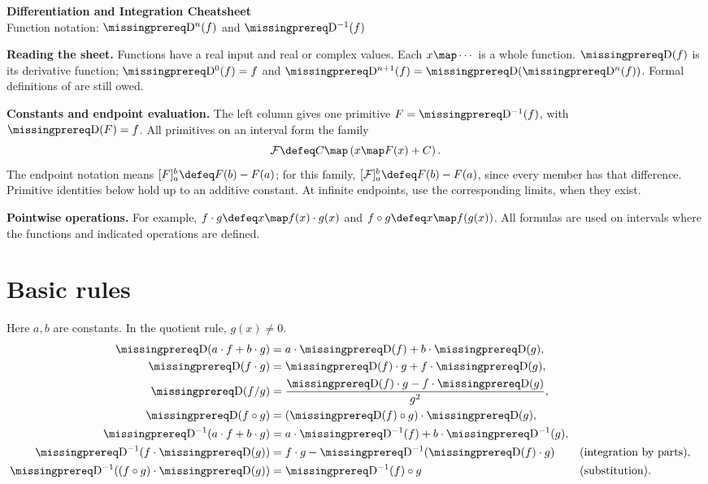 \documentclass[10pt]{article}
\begin{document}
\begin{center}
  {\Large\bfseries Differentiation and Integration Cheatsheet}\\[2pt]
  Function notation: $\DiffOp^n(f)$ and $\DiffOp^{-1}(f)$
\end{center}

\textbf{Reading the sheet.}
Functions have a real input and real or complex values. Each $x\map\cdots$ is
a whole function. $\DiffOp(f)$ is its derivative function;
$\DiffOp^0(f)=f$ and $\DiffOp^{n+1}(f)=\DiffOp(\DiffOp^n(f))$.
Formal definitions of  are still owed.

\textbf{Constants and endpoint evaluation.}
The left column gives one primitive $F=\DiffOp^{-1}(f)$, with $\DiffOp(F)=f$.
All primitives on an interval form the family
\[
  \mathcal F\defeq C\map\left(x\map F(x)+C\right).
\]
The endpoint notation means $[F]_a^b\defeq F(b)-F(a)$; for this family,
$[\mathcal F]_a^b\defeq F(b)-F(a)$, since every member has that difference.
Primitive identities below hold up to an additive constant. At infinite endpoints,
use the corresponding limits, when they exist.

\textbf{Pointwise operations.}
For example, $f\cdot g\defeq x\map f(x)\cdot g(x)$ and
$f\circ g\defeq x\map f(g(x))$. All formulas are used on intervals where the
functions and indicated operations are defined.

\section*{Basic rules}
Here $a,b$ are constants. In the quotient rule, $g(x)\ne0$.
\begin{align*}
  \DiffOp(a\cdot f+b\cdot g)
    &=a\cdot\DiffOp(f)+b\cdot\DiffOp(g),\\
  \DiffOp(f\cdot g)
    &=\DiffOp(f)\cdot g+f\cdot\DiffOp(g),\\
  \DiffOp(f/g)
    &=\frac{\DiffOp(f)\cdot g-f\cdot\DiffOp(g)}{g^2},\\
  \DiffOp(f\circ g)
    &=(\DiffOp(f)\circ g)\cdot\DiffOp(g),\\
  \DiffOp^{-1}(a\cdot f+b\cdot g)
    &=a\cdot\DiffOp^{-1}(f)+b\cdot\DiffOp^{-1}(g),\\
  \DiffOp^{-1}(f\cdot\DiffOp(g))
    &=f\cdot g-\DiffOp^{-1}(\DiffOp(f)\cdot g)
      &&\text{(integration by parts)},\\
  \DiffOp^{-1}((f\circ g)\cdot\DiffOp(g))
    &=\DiffOp^{-1}(f)\circ g
      &&\text{(substitution)}.
\end{align*}
\end{document}
